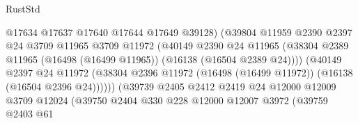 \begin{lexlean}{RustStd}
\begin{coremodule}
                                          @17634
                                          @17637
                                          @17640
                                          @17644
                                          @17649
                                          @39128)
                                        (@39804
                                          @11959
                                          @2390
                                          @2397
                                          @24
                                          @3709
                                          @11965
                                          @3709
                                          @11972
                                          (@40149
                                            @2390
                                            @24
                                            @11965
                                            (@38304
                                              @2389
                                              @11965
                                              (@16498 (@16499 @11965))
                                              (@16138 (@16504 @2389 @24))))
                                          (@40149
                                            @2397
                                            @24
                                            @11972
                                            (@38304
                                              @2396
                                              @11972
                                              (@16498 (@16499 @11972))
                                              (@16138 (@16504 @2396 @24))))))
                                      (@39739
                                        @2405
                                        @2412
                                        @2419
                                        @24
                                        @12000
                                        @12009
                                        @3709
                                        @12024
                                        (@39750
                                          @2404
                                          @330
                                          @228
                                          @12000
                                          @12007
                                          @3972
                                          (@39759
                                            @2403
                                            @61

\end{coremodule}
\end{lexlean}
